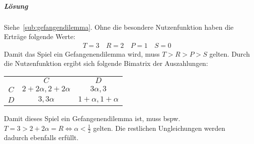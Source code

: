 \subparagraph{Lösung}%
Siehe~\ref{sub:gefangendilemma}.
Ohne die besondere Nutzenfunktion haben die Erträge folgende Werte:
\begin{align*}
  T = 3 \quad R = 2 \quad P = 1 \quad S = 0
\end{align*}
Damit das Spiel ein Gefangenendilemma wird, muss $T > R > P > S$ gelten.
Durch die Nutzenfunktion ergibt sich folgende Bimatrix der Auszahlungen:
\begin{center}
  \begin{tabular}{ccc}
    & $C$ & $D$\\
    \cmidrule{2-3}
    $C$ & $2+2\alpha,2+2\alpha$ & $3\alpha,3$\\
    \cmidrule{2-3}
    $D$ & $3,3\alpha$ & $1+\alpha,1+\alpha$\\
    \cmidrule{2-3}
  \end{tabular}
\end{center}
Damit dieses Spiel ein Gefangenendilemma ist, muss bspw.
$T = 3 > 2+2\alpha = R \iff \alpha < \frac{1}{2}$
gelten.
Die restlichen Ungleichungen werden dadurch ebenfalls erfüllt.

